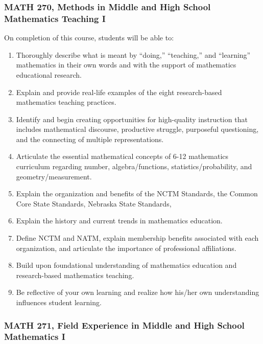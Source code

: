 \documentclass[11pt]{article}
\newenvironment{alphalist}{
\begin{enumerate}[label=(\arabic*),widest=107 ,leftmargin=25pt, itemsep=0pt]}
{\end{enumerate}}
\begin{document}
\subsubsection*{MATH 270, Methods in Middle and High School Mathematics Teaching I}

On completion of this course, students will be able to:
\begin{alphalist}

\item Thoroughly describe what is meant by “doing,”  “teaching,”  and “learning” mathematics in their own words and with the support of mathematics educational research.
\item Explain and provide real-life examples of the eight research-based mathematics teaching practices.
\item Identify and begin creating opportunities for high-quality instruction that includes mathematical 
discourse, productive struggle, purposeful questioning, and the connecting of multiple representations. 
\item Articulate the essential mathematical concepts of 6-12 mathematics curriculum regarding number, algebra/functions, statistics/probability, and geometry/measurement.
\item Explain the organization and benefits of the NCTM Standards, the Common Core State Standards, Nebraska State Standards, 
\item Explain the history and current trends in mathematics education.
\item Define NCTM and NATM, explain membership benefits associated with each organization, and articulate the importance of professional affiliations.
\item Build upon foundational understanding of mathematics education and research-based mathematics teaching.
\item Be reflective of your own learning and realize how his/her own understanding influences student learning.
\end{alphalist}

\subsubsection*{MATH 271, Field Experience in Middle and High School Mathematics I}
\end{document}
